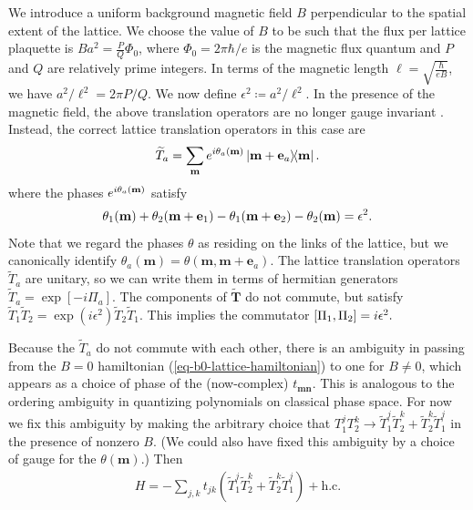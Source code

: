 \documentclass[aps,prb,twocolumn,letterpaper,twoside,nobalancelastpage,groupedaddress,amsmath,amssymb,floatfix,citeautoscript]{revtex4-1}
\begin{document}
We introduce a uniform background magnetic field $B$ perpendicular to the spatial extent of the lattice. We choose the value of $B$ to be such that the flux per lattice plaquette is $Ba^2 = \frac{P}{Q}\Phi_0$, where $\Phi_0 = 2\pi \hbar /e$ is the magnetic flux quantum and $P$ and $Q$ are relatively prime integers. In terms of the magnetic length $\ell = \sqrt{\frac{\hbar}{eB}}$, we have $a^2/\ell^2 = 2 \pi P/Q$. We now define $\epsilon^2 \coloneqq a^2/\ell^2$. In the presence of the magnetic field, the above translation operators are no longer gauge invariant \cite{FradkinBook}. Instead, the correct lattice translation operators in this case are\cite{}
\begin{align*}
\widetilde{T}_a = \sum_{\mathbf{m}} e^{i\theta_a(\mathbf{m})} \dyad{\bfm + \mathbf{e}_a}{\bfm}.
\end{align*}
where the phases $e^{i\theta_a(\mathbf{m})}$ satisfy 
\begin{align*}
\theta_1(\mathbf{m}) + \theta_2(\mathbf{m} + \mathbf{e}_1) - \theta_1(\mathbf{m} + \mathbf{e}_2) - \theta_2(\mathbf{m}) = \epsilon^2.
\end{align*}
Note that we regard the phases $\theta$ as residing on the links of the lattice, but we canonically identify $\theta_a(\mathbf{m}) = \theta(\mathbf{m},\mathbf{m}+\mathbf{e}_a)$.
The lattice translation operators $\widetilde{T}_a$ are unitary, so we can write them in terms of hermitian generators $\widetilde{T}_a = \exp\left[-i \Pi_a\right]$. The components of $\widetilde{\mathbf{T}}$ do not commute, but satisfy $\widetilde{T}_1 \widetilde{T}_2 = \exp(i\epsilon^2) \widetilde{T}_2 \widetilde{T}_1 $. This implies the commutator
$\comm{\Pi_1}{\Pi_2} = i \epsilon^2.$


Because the $\widetilde{T}_a$ do not commute with each other, there is an ambiguity in passing from the $B=0$ hamiltonian (\ref{eq-b0-lattice-hamiltonian}) to one for $B\neq0$, which appears as a choice of phase of the (now-complex) $t_{\mathbf{m}\mathbf{n}}$. This is analogous to the ordering ambiguity in quantizing polynomials on classical phase space. For now we fix this ambiguity by making the arbitrary choice that $T_1^j T_2^k \rightarrow \widetilde{T}_1^j \widetilde{T}_2^k + \widetilde{T}_2^k\widetilde{T}_1^j$ in the presence of nonzero $B$. (We could also have fixed this ambiguity by a choice of gauge for the $\theta(\mathbf{m})$.) Then
\begin{align*}
H = -\sum_{j,k} t_{jk}\left(\widetilde{T}_1^j \widetilde{T}_2^k + \widetilde{T}_2^k\widetilde{T}_1^j\right) + \text{h.c.}
\end{align*}
\end{document}
